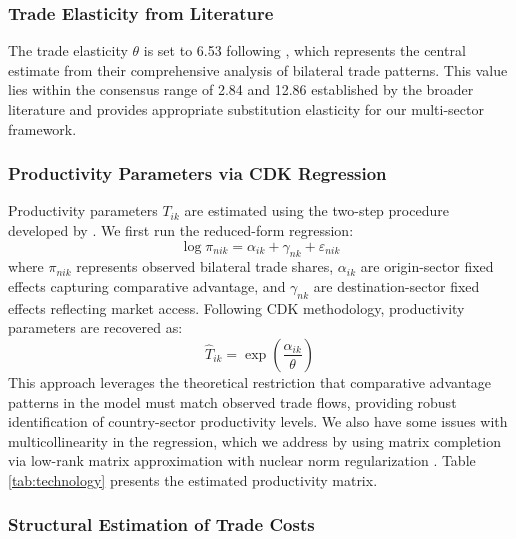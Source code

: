 \subsubsection{Trade Elasticity from Literature}

The trade elasticity $\theta$ is set to 6.53 following \cite{costinot2012TheReviewofEconomicStudies}, which represents the central estimate from their comprehensive analysis of bilateral trade patterns. This value lies within the consensus range of 2.84 and 12.86 established by the broader literature \citep{eaton2002Econometrica} and provides appropriate substitution elasticity for our multi-sector framework.

\subsubsection{Productivity Parameters via CDK Regression}

Productivity parameters $T_{ik}$ are estimated using the two-step procedure developed by \cite{costinot2012TheReviewofEconomicStudies}. We first run the reduced-form regression:
\begin{equation}
\log \pi_{nik} = \alpha_{ik} + \gamma_{nk} + \varepsilon_{nik}
\end{equation}
where $\pi_{nik}$ represents observed bilateral trade shares, $\alpha_{ik}$ are origin-sector fixed effects capturing comparative advantage, and $\gamma_{nk}$ are destination-sector fixed effects reflecting market access. Following CDK methodology, productivity parameters are recovered as:
\begin{equation}\hat{T}_{ik} = \exp\left(\frac{\hat{\alpha}_{ik}}{\theta}\right)
\end{equation}
This approach leverages the theoretical restriction that comparative advantage patterns in the model must match observed trade flows, providing robust identification of country-sector productivity levels. We also have some issues with multicollinearity in the regression, which we address by using matrix completion via low-rank matrix approximation with nuclear norm regularization \citep{mazumder2010spectral}. Table \ref{tab:technology} presents the estimated productivity matrix.

\subsubsection{Structural Estimation of Trade Costs}

